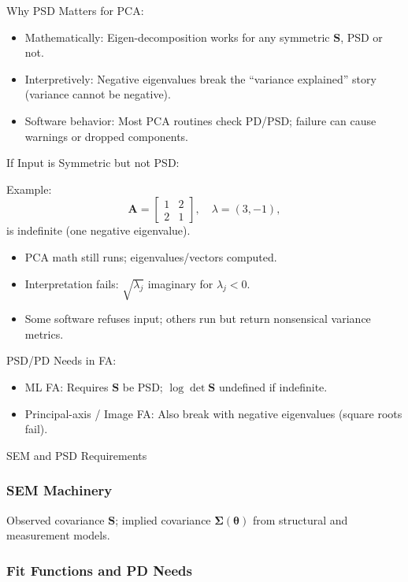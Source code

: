 \documentclass[
  12pt,
]{article}
\providecommand{\tightlist}{%
  \setlength{\itemsep}{0pt}\setlength{\parskip}{0pt}}
\theoremstyle{plain}
\theoremstyle{definition}
\theoremstyle{remark}
\begin{document}
Why PSD Matters for PCA:

\begin{itemize}
\tightlist
\item
  Mathematically: Eigen-decomposition works for any symmetric
  \(\mathbf{S}\), PSD or not.
\item
  Interpretively: Negative eigenvalues break the ``variance explained''
  story (variance cannot be negative).
\item
  Software behavior: Most PCA routines check PD/PSD; failure can cause
  warnings or dropped components.
\end{itemize}

If Input is Symmetric but not PSD:

Example: \[
\mathbf{A} = \begin{bmatrix} 1 & 2 \\ 2 & 1 \end{bmatrix},\quad \lambda = (3,-1),
\] is indefinite (one negative eigenvalue).

\begin{itemize}
\tightlist
\item
  PCA math still runs; eigenvalues/vectors computed.
\item
  Interpretation fails: \(\sqrt{\lambda_j}\) imaginary for
  \(\lambda_j<0\).
\item
  Some software refuses input; others run but return nonsensical
  variance metrics.
\end{itemize}

PSD/PD Needs in FA:

\begin{itemize}
\tightlist
\item
  ML FA: Requires \(\mathbf{S}\) be PSD; \(\log \det \mathbf{S}\)
  undefined if indefinite.
\item
  Principal-axis / Image FA: Also break with negative eigenvalues
  (square roots fail).
\end{itemize}

SEM and PSD Requirements

\subsubsection{SEM Machinery}\label{sem-machinery}

Observed covariance \(\mathbf{S}\); implied covariance
\(\boldsymbol\Sigma(\boldsymbol\theta)\) from structural and measurement
models.

\subsubsection{Fit Functions and PD
Needs}\label{fit-functions-and-pd-needs}
\end{document}
